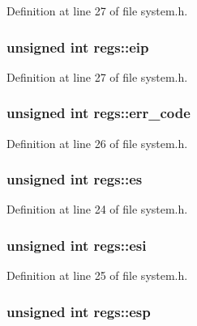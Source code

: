 Definition at line 27 of file system.\+h.

\subsubsection[{\texorpdfstring{eip}{eip}}]{\setlength{\rightskip}{0pt plus 5cm}unsigned int regs\+::eip}\hypertarget{structregs_a483d469ae6b388e4df869c1ebd61d713}{}\label{structregs_a483d469ae6b388e4df869c1ebd61d713}


Definition at line 27 of file system.\+h.

\subsubsection[{\texorpdfstring{err\+\_\+code}{err_code}}]{\setlength{\rightskip}{0pt plus 5cm}unsigned int regs\+::err\+\_\+code}\hypertarget{structregs_a37177085b61efd8c7d777880ed814ffe}{}\label{structregs_a37177085b61efd8c7d777880ed814ffe}


Definition at line 26 of file system.\+h.

\subsubsection[{\texorpdfstring{es}{es}}]{\setlength{\rightskip}{0pt plus 5cm}unsigned int regs\+::es}\hypertarget{structregs_a8a3e5cd6d92486294b5bdda1963fde40}{}\label{structregs_a8a3e5cd6d92486294b5bdda1963fde40}


Definition at line 24 of file system.\+h.

\subsubsection[{\texorpdfstring{esi}{esi}}]{\setlength{\rightskip}{0pt plus 5cm}unsigned int regs\+::esi}\hypertarget{structregs_ab25239e8d63dfa05c9ad2f2ba4a0ff7a}{}\label{structregs_ab25239e8d63dfa05c9ad2f2ba4a0ff7a}


Definition at line 25 of file system.\+h.

\subsubsection[{\texorpdfstring{esp}{esp}}]{\setlength{\rightskip}{0pt plus 5cm}unsigned int regs\+::esp}\hypertarget{structregs_a6671599aa5e59fd804561c1c1ed7c53a}{}\label{structregs_a6671599aa5e59fd804561c1c1ed7c53a}


